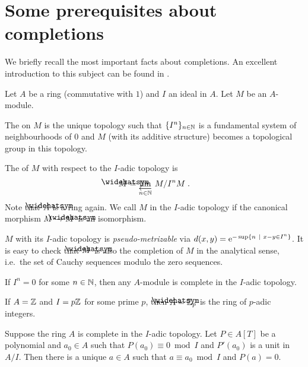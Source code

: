 \documentclass[a4paper,parskip=half,numbers=enddot, DIV=12]{scrreprt}
\begin{document}
\section{Some prerequisites about completions}
We briefly recall the most important facts about completions. An excellent introduction to this subject can be found in \cite[Section~10]{atiyahMacdonald}.
\begin{defi}
	Let $A$ be a ring (commutative with $1$) and $I$ an ideal in $A$. Let $M$ be an $A$-module.
	\begin{alphanumerate}
		\item The  on $M$ is the unique topology such that $\{I^n\}_{n\in \mathbb{N}}$ is a fundamental system of neighbourhoods of $0$ and $M$ (with its additive structure) becomes a topological group in this topology.
		\item The  of $M$ with respect to the $I$-adic topology is
		\begin{align*}
			\roof{M}=\limit[n\in \IN]M/I^nM\;.
		\end{align*}
		Note that $\roof{A}$ is a ring again. We call $M$  in the $I$-adic topology if the canonical morphism $M\morphism\roof{M}$ is an isomorphism.
	\end{alphanumerate}
\end{defi}
\begin{rem}
	$M$ with its $I$-adic topology is \emph{pseudo-metrizable} via $d(x,y)=\mathrm{e}^{-\sup\left\{n\ \middle|\  x-y\in I^n\right\}}$. It is easy to check that $\roof{M}$ is also the completion of $M$ in the analytical sense, i.e.\ the set of Cauchy sequences modulo the zero sequences.
\end{rem}
\begin{example}
	If $I^n=0$ for some $n\in \mathbb{N}$, then any $A$-module is complete in the $I$-adic topology.
\end{example}
\begin{example}
	If $A=\mathbb{Z}$ and $I=p\mathbb{Z}$ for some prime $p$, then $\roof{A}=\IZ_p$ is the ring of $p$-adic integers.
\end{example}
\begin{prop}
	Suppose the ring $A$ is complete in the $I$-adic topology. Let $P\in A[T]$ be a polynomial and $a_0\in A$ such that $P(a_0)\equiv 0\bmod I$ and $P'(a_0)$ is a unit in $A/I$. Then there is a unique $a\in A$ such that $a\equiv a_0\bmod I$ and $P(a)=0$.
\end{prop}
\end{document}
